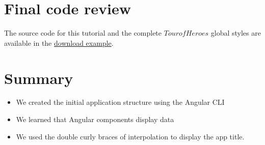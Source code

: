 \section{Final code review}
The source code for this tutorial and the complete $Tour of Heroes$ global styles are available in the \href{https://angular.io/generated/zips/toh-pt0/toh-pt0.zip}{download example}.

\section{Summary}
\begin{itemize}
    \item We created the initial application structure using the Angular CLI
    \item We learned that Angular components display data
    \item We used the double curly braces of interpolation to display the app title.
\end{itemize}
